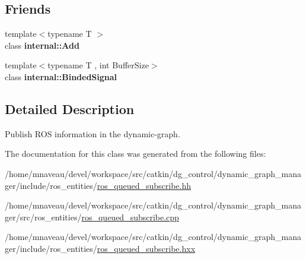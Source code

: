 \subsection*{Friends}
\begin{DoxyCompactItemize}
\item 
{\footnotesize template$<$typename T $>$ }\\class {\bfseries internal\+::\+Add}\hypertarget{classdynamic__graph_1_1RosQueuedSubscribe_aff86e359edc93019ec7be05f8207a40d}{}\label{classdynamic__graph_1_1RosQueuedSubscribe_aff86e359edc93019ec7be05f8207a40d}

\item 
{\footnotesize template$<$typename T , int Buffer\+Size$>$ }\\class {\bfseries internal\+::\+Binded\+Signal}\hypertarget{classdynamic__graph_1_1RosQueuedSubscribe_a9df2fc52f650be6e579db5873effd4e8}{}\label{classdynamic__graph_1_1RosQueuedSubscribe_a9df2fc52f650be6e579db5873effd4e8}

\end{DoxyCompactItemize}


\subsection{Detailed Description}
Publish R\+OS information in the dynamic-\/graph. 

The documentation for this class was generated from the following files\+:\begin{DoxyCompactItemize}
\item 
/home/mnaveau/devel/workspace/src/catkin/dg\+\_\+control/dynamic\+\_\+graph\+\_\+manager/include/ros\+\_\+entities/\hyperlink{ros__queued__subscribe_8hh}{ros\+\_\+queued\+\_\+subscribe.\+hh}\item 
/home/mnaveau/devel/workspace/src/catkin/dg\+\_\+control/dynamic\+\_\+graph\+\_\+manager/src/ros\+\_\+entities/\hyperlink{ros__queued__subscribe_8cpp}{ros\+\_\+queued\+\_\+subscribe.\+cpp}\item 
/home/mnaveau/devel/workspace/src/catkin/dg\+\_\+control/dynamic\+\_\+graph\+\_\+manager/include/ros\+\_\+entities/\hyperlink{ros__queued__subscribe_8hxx}{ros\+\_\+queued\+\_\+subscribe.\+hxx}\end{DoxyCompactItemize}
